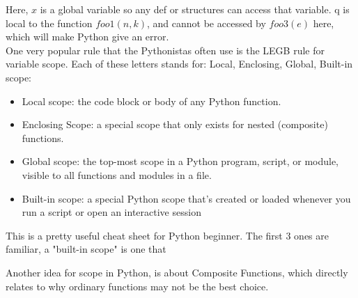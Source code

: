 \documentclass[twoside,final]{hcmut-report}
\begin{document}
\hspace*{6.5mm} Here, $x$ is a global variable so any def or structures can access that variable. q is local to the function $foo1(n,k)$, and cannot be accessed by $foo3(e)$ here, which will make Python give an error.\\
\hspace*{6.5mm} One very popular rule that the Pythonistas often use is the LEGB rule for variable scope. Each of these letters stands for: Local, Enclosing, Global, Built-in scope:
\begin{itemize}
\item Local scope: the code block or body of any Python function.
\item Enclosing Scope: a special scope that only exists for nested (composite) functions.
\item Global scope: the top-most scope in a Python program, script, or module, visible to all functions and modules in a file.
\item Built-in scope: a special Python scope that’s created or loaded whenever you run a script or open an interactive session

\end{itemize}
\hspace*{6.5mm} This is a pretty useful cheat sheet for Python beginner. The first 3 ones are familiar, a "built-in scope" is one that 

\hspace*{6.5mm} Another idea for scope in Python, is about Composite Functions, which directly relates to why ordinary functions may not be the best choice.\\
\end{document}
